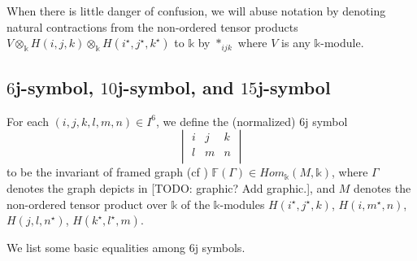 \noindent When there is little danger of confusion, we will abuse
notation by denoting natural contractions from the non-ordered
tensor products
$V \otimes_{\mathbb{k}} H(i,j,k) \otimes_{\mathbb{k}} H(i^{\star}, j^{\star}, k^{\star})$
to $\mathbb{k}$ by $\ast_{ijk}$ where $V$ is any
$\mathbb{k}$-module.

\subsection{$6$j-symbol, $10$j-symbol, and $15$j-symbol}

\newcommand{\sixJSymbol}[6]{\begin{vmatrix}
  #1 & #2 & #3 \\
  #4 & #5 & #6 \\
\end{vmatrix}}

\begin{definition}[$6$j-symbol]\label{def/6j-symbol}
  For each $(i,j,k,l,m,n) \in I^{6}$, we define the (normalized)
  $6$j symbol
  $$\sixJSymbol{i}{j}{k}{l}{m}{n}$$
  to be the invariant of framed graph (cf \cite[section
  VI.4]{turaev-qiok-3-manifolds})
  $\mathbb{F}(\Gamma) \in Hom_{\mathbb{k}}(M, \mathbb{k})$, where
  $\Gamma$ denotes the graph depicts in [TODO: graphic? Add
  graphic.], and $M$ denotes the non-ordered tensor product over
  $\mathbb{k}$ of the $\mathbb{k}$-modules
  $H(i^{\star}, j^{\star}, k)$, $H(i, m^{\star}, n)$,
  $H(j, l, n^{\star})$, $H(k^{\star}, l^{\star}, m)$.
\end{definition}

We list some basic equalities among $6$j symbols.

